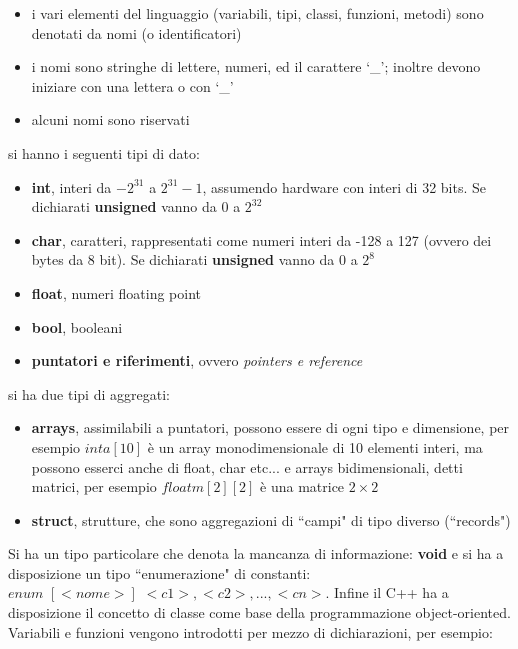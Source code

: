 \documentclass[a4paper,12pt, oneside]{book}
\begin{document}
\begin{itemize}
\item i vari elementi del linguaggio (variabili, tipi, classi, funzioni, metodi) sono denotati da nomi (o identificatori)
\item i nomi sono stringhe di lettere, numeri, ed il carattere ‘\_’; inoltre devono iniziare con una lettera o con ‘\_’
\item alcuni nomi sono riservati
\end{itemize}
\newpage
si hanno i seguenti tipi di dato:
\begin{itemize}
\item \textbf{int}, interi da $-2^{31}$ a $2^{31}-1$, assumendo hardware con interi di 32 bits. Se dichiarati \textbf{unsigned} vanno da $0$ a $2^32$
\item \textbf{char}, caratteri, rappresentati come numeri interi da -128 a 127 (ovvero dei
bytes da 8 bit). Se dichiarati \textbf{unsigned} vanno da $0 $ a $2^8$
\item \textbf{float}, numeri floating point
\item \textbf{bool}, booleani
\item \textbf{puntatori e riferimenti}, ovvero \textit{pointers e reference}
\end{itemize}
si ha due tipi di aggregati:
\begin{itemize}
\item \textbf{arrays}, assimilabili a puntatori, possono essere di ogni tipo e dimensione, per esempio $int a[10]$ è un array monodimensionale di 10 elementi interi, ma possono esserci anche di float, char etc... e arrays bidimensionali, detti matrici, per esempio $float m[2][2]$ è una matrice $2\times 2$
\item \textbf{struct}, strutture, che sono aggregazioni di “campi" di tipo diverso (“records")
\end{itemize}
Si ha un tipo particolare che denota la mancanza di informazione: \textbf{void} e si ha a disposizione un tipo “enumerazione" di constanti: \\$enum\,\, [<nome>]\,\, { <c1>, <c2>, ..., <cn> }$. Infine il C++ ha a disposizione il concetto di classe come base della programmazione object-oriented.		\\
Variabili e funzioni vengono introdotti per mezzo di dichiarazioni, per esempio:
\end{document}
